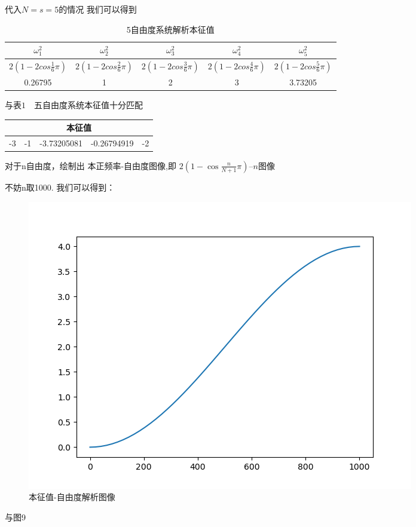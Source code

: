 \documentclass[11pt, a4paper, oneside]{ctexart}
\begin{document}
{{{代入$N=s=5$的情况
我们可以得到


\begin{table}[h]
    \centering
    \caption{5自由度系统解析本征值}
    \begin{tabular}{@{}ccccc@{}}
    \toprule
    $\omega_1^2$              & $\omega_2^2$              & $\omega_3^2$              & $\omega_4^2$              & $\omega_5^2$              \\ \midrule
    $2(1-2cos\frac{1}{6}\pi)$ & $2(1-2cos\frac{2}{6}\pi)$ & $2(1-2cos\frac{3}{6}\pi)$ & $2(1-2cos\frac{4}{6}\pi)$ & $2(1-2cos\frac{5}{6}\pi)$ \\ \midrule
    0.26795                   & 1                         & 2                         & 3                         & 3.73205                   \\ \bottomrule
    \end{tabular}
    \end{table}
与表$1\quad${五自由度系统本征值}十分匹配
\begin{table}[h]
    \centering
    \begin{tabular}{@{}p{2cm}<{\centering}p{2cm}<{\centering}p{2cm}<{\centering}p{2cm}<{\centering}p{2cm}<{\centering}@{}}
    \toprule
    \multicolumn{5}{c}{本征值}                  \\ \midrule
    -3 & -1 & -3.73205081 & -0.26794919 & -2 \\ \bottomrule
    \end{tabular}
    \end{table}

对于n自由度，绘制出 本正频率-自由度图像,即
 ${2 }\left(1-\cos\frac{n}{N+1} \pi\right)$--$n$图像

 不妨n取1000.
我们可以得到：
  \begin{figure}[H]
        
    \centering
    \vspace{2mm}
    \includegraphics[scale=0.45]{1000_1.png}
    \caption{本征值-自由度解析图像}
\end{figure} 
与图9
 \begin{figure}[H]
        

\end{figure}}}}
\end{document}

